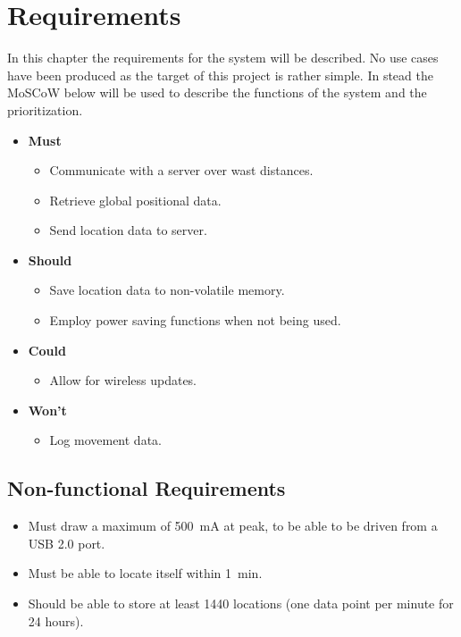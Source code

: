 
\chapter{Requirements}
\label{chap:requirements}
In this chapter the requirements for the system will be described.
No use cases have been produced as the target of this project is rather simple.
In stead the MoSCoW below will be used to describe the functions of the system and the prioritization.

\begin{itemize}
	\item \textbf{Must}
	\begin{itemize}
		\item Communicate with a server over wast distances.
		\item Retrieve global positional data.
		\item Send location data to server.
	\end{itemize}
	\item \textbf{Should}
	\begin{itemize}
		\item Save location data to non-volatile memory.
		\item Employ power saving functions when not being used.
	\end{itemize}
	\item \textbf{Could}
	\begin{itemize}
		\item Allow for wireless updates.
	\end{itemize}
	\item \textbf{Won't}
	\begin{itemize}
		\item Log movement data.
	\end{itemize}
\end{itemize}

\section{Non-functional Requirements}
\begin{itemize}
	\item Must draw a maximum of \SI{500}{\milli\ampere} at peak, to be able to be driven from a USB 2.0 port.
	\item Must be able to locate itself within \SI{1}{\minute}.
	\item Should be able to store at least \num{1440} locations (one data point per minute for \num{24} hours).
\end{itemize}